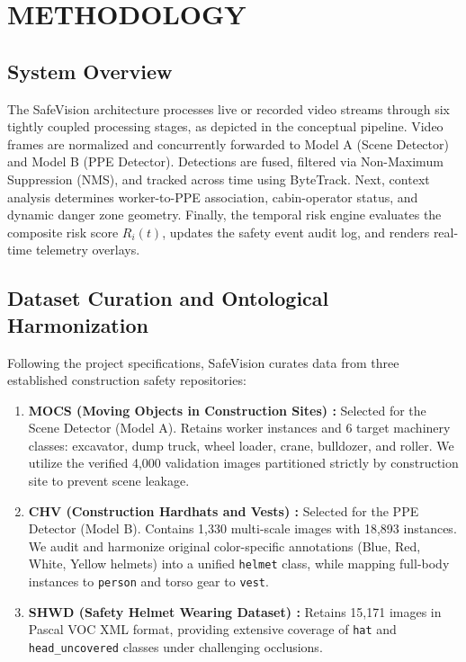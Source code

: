 \documentclass[letterpaper, 10 pt, conference]{ieeeconf}
\begin{document}
\section{METHODOLOGY}

\subsection{System Overview}
The SafeVision architecture processes live or recorded video streams through six tightly coupled processing stages, as depicted in the conceptual pipeline. Video frames are normalized and concurrently forwarded to Model A (Scene Detector) and Model B (PPE Detector). Detections are fused, filtered via Non-Maximum Suppression (NMS), and tracked across time using ByteTrack. Next, context analysis determines worker-to-PPE association, cabin-operator status, and dynamic danger zone geometry. Finally, the temporal risk engine evaluates the composite risk score $R_i(t)$, updates the safety event audit log, and renders real-time telemetry overlays.

\subsection{Dataset Curation and Ontological Harmonization}
Following the project specifications, SafeVision curates data from three established construction safety repositories:
\begin{enumerate}
    \item \textbf{MOCS (Moving Objects in Construction Sites) \cite{an2021dataset}:} Selected for the Scene Detector (Model A). Retains worker instances and 6 target machinery classes: excavator, dump truck, wheel loader, crane, bulldozer, and roller. We utilize the verified 4,000 validation images partitioned strictly by construction site to prevent scene leakage.
    \item \textbf{CHV (Construction Hardhats and Vests) \cite{wang2021fast}:} Selected for the PPE Detector (Model B). Contains 1,330 multi-scale images with 18,893 instances. We audit and harmonize original color-specific annotations (Blue, Red, White, Yellow helmets) into a unified \texttt{helmet} class, while mapping full-body instances to \texttt{person} and torso gear to \texttt{vest}.
    \item \textbf{SHWD (Safety Helmet Wearing Dataset) \cite{liu2025safety}:} Retains 15,171 images in Pascal VOC XML format, providing extensive coverage of \texttt{hat} and \texttt{head\_uncovered} classes under challenging occlusions.
\end{enumerate}
\end{document}
